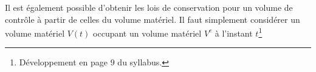 \documentclass[a4paper,11pt]{report}
\begin{document}
      Il est également possible d'obtenir les lois de conservation pour un volume de contrôle à partir de celles du volume matériel. Il faut simplement considérer un volume matériel $V(t)$ occupant un volume matériel $V^c$ à l'instant $t$\footnote{Développement en page $9$ du syllabus.}

\begin{appendix}

\end{appendix}
\end{document}

